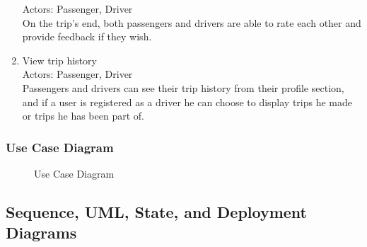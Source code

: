 \documentclass[a4paper, 12pt]{article} %
\begin{document}
\begin{enumerate}
                    Actors: Passenger, Driver\\
                    On the trip's end, both passengers and drivers are able to rate each other and provide feedback if they wish.
                \item View trip history \\
                    Actors: Passenger, Driver \\
                    Passengers and drivers can see their trip history from their profile section, and if a user is registered as a driver he can choose to display trips he made or trips he has been part of.
            \end{enumerate}
        
        \pagebreak
        \subsubsection{Use Case Diagram}

            \begin{figure}[h]
                \centering
                \caption{Use Case Diagram}
                \label{fig:usecase}
            \end{figure}

    \pagebreak
    \subsection{Sequence, UML, State, and Deployment Diagrams}
\end{document}
